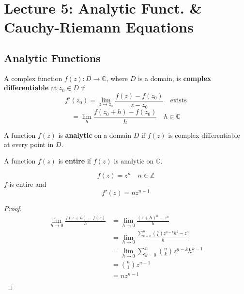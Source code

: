 \chapter{Lecture 5: Analytic Funct. \& Cauchy-Riemann Equations}

\section{Analytic Functions}

\begin{definition}
    A complex function $f(z): D \to \mathbb{C}$, where $D$ is a domain, is \textbf{complex differentiable} at $z_0 \in D$ if
    $$f'(z_0) = \lim_{z \to z_0} \frac{f(z) - f(z_0)}{z - z_0} \quad \text{exists}$$
    $$ = \lim_{h} \frac{f(z_0 + h) - f(z_0)}{h} \quad h \in \mathbb{C}$$
\end{definition}

\begin{definition}
    [Analytic]
    A function $f(z)$ is \textbf{analytic} on a domain $D$ if $f(z)$ is complex differentiable at every point in $D$.
\end{definition}

\begin{definition}
    [Entire]
    A function $f(z)$ is \textbf{entire} if $f(z)$ is analytic on $\mathbb{C}$.
\end{definition}

\begin{example}
    $$f(z) = z^n \quad n \in \mathbb{Z}$$
    $f$ is entire and
    $$f'(z) = nz^{n-1}$$
\end{example}
\begin{proof}
    \begin{align*}
        \lim_{h \to 0} \frac{f(z + h) - f(z)}{h} & = \lim_{h \to 0} \frac{(z + h)^n - z^n}{h}                               \\
                                                 & = \lim_{h \to 0} \frac{\sum_{k=0}^{n} \binom{n}{k} z^{n-k} h^k - z^n}{h} \\
                                                 & = \lim_{h \to 0} \sum_{k=0}^{n} \binom{n}{k} z^{n-k} h^{k-1}             \\
                                                 & = \binom{n}{1} z^{n-1}                                                   \\
                                                 & = nz^{n-1}                                                               \\
    \end{align*}
\end{proof}

